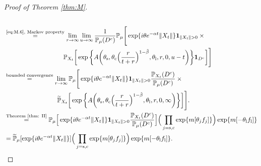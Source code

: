 \documentclass[12pt,a4paper]{amsart}
\theoremstyle{plain}
\theoremstyle{definition}
\numberwithin{equation}{section}
\begin{document}
\begin{proof}[Proof of Theorem \ref{thm:M}]
\begin{align}
	\\&
\begin{multlined}
	\overset{\text{\eqref{eq:M.6}, Markov property}}=\lim_{r\to \infty}\lim_{u\rightarrow\infty}\frac{1}{\mathbb P_{\mu}(D^c)} \mathbb P_{\mu}\Bigg[\exp\{ i\theta e^{-\alpha t}\|X_t\|\}\mathbf 1_{\|X_t\|>0} \times {}
	\\ \mathbb P_{X_t}\bigg[\exp\bigg\{A\bigg(\theta_\mathrm s,\theta_\mathrm c\Big(\frac{r}{t+r}\Big)^{1-\tilde \beta},\theta_\mathrm l,r,0,u-t\bigg)\bigg\}\mathbf 1_{D^c}\bigg]\Bigg]
\end{multlined}
	\\&\begin{multlined}\overset{\text{bounded convergence}}=\lim_{r\to \infty} \mathbb P_{\mu}\Bigg[\exp\{ i\theta e^{-\alpha t}\|X_t\|\} \mathbf 1_{\|X_t\|>0}\frac{\mathbb P_{X_t}(D^c)}{\mathbb P_{\mu}(D^c)} \times {}
	\\\widetilde{\mathbb P}_{X_t}\bigg[\exp\bigg\{A\bigg(\theta_\mathrm s,\theta_\mathrm c\Big(\frac{r}{t+r}\Big)^{1-\tilde \beta},\theta_\mathrm l,r,0,\infty\bigg)\bigg\}\bigg]\Bigg].
\end{multlined}
	\\& \overset{\text{Theorem \ref{thm: II}}}=  \mathbb P_{\mu}\Big[\exp\{ i\theta e^{-\alpha t}\|X_t\|\} \mathbf 1_{\|X_t\|>0}\frac{\mathbb P_{X_t}(D^c)}{\mathbb P_{\mu}(D^c)} \Big]\Big(\prod_{j=\mathrm s,\mathrm c}\exp\{m[\theta_j f_j]\}\Big)\exp\{m[-\theta_\mathrm l f_\mathrm l]\}
	\\&=\widetilde{\mathbb P}_{\mu}[\exp\{i\theta e^{-\alpha t}\|X_t\|\}]
	\Big(\prod_{j=\mathrm s,\mathrm c}\exp\{m[\theta_j f_j]\}\Big)\exp\{m[-\theta_\mathrm l f_\mathrm l]\}.
	\qedhere
\end{align}
\end{proof}
\end{document}

